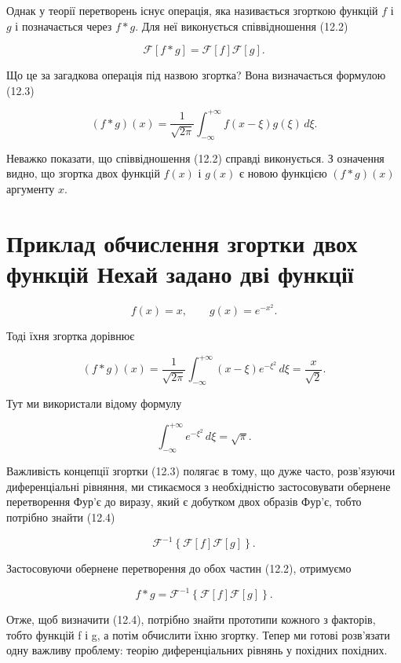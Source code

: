 \documentclass[
  ukrainian,
]{article}
\begin{document}
Однак у теорії перетворень існує операція, яка називається згорткою
функцій \(f\) і \(g\) і позначається через \(f*g\). Для неї виконується
співвідношення (12.2)

\[
\mathcal{F}[f*g] = \mathcal{F}[f]\mathcal{F}[g].
\]

Що це за загадкова операція під назвою згортка? Вона визначається
формулою (12.3)

\[
(f*g)(x) = \frac{1}{\sqrt{2\pi}} \int_{-\infty}^{+\infty} f(x-\xi)g(\xi)\,d\xi.
\]

Неважко показати, що співвідношення (12.2) справді виконується. З
означення видно, що згортка двох функцій \(f(x)\) і \(g(x)\) є новою
функцією \((f*g)(x)\) аргументу \(x\).

\section{Приклад обчислення згортки двох функцій Нехай задано дві
функції}\label{ux43fux440ux438ux43aux43bux430ux434-ux43eux431ux447ux438ux441ux43bux435ux43dux43dux44f-ux437ux433ux43eux440ux442ux43aux438-ux434ux432ux43eux445-ux444ux443ux43dux43aux446ux456ux439-ux43dux435ux445ux430ux439-ux437ux430ux434ux430ux43dux43e-ux434ux432ux456-ux444ux443ux43dux43aux446ux456ux457}

\[
f(x) = x, \qquad g(x) = e^{-x^2}.
\]

Тоді їхня згортка дорівнює

\[
(f*g)(x) = \frac{1}{\sqrt{2\pi}} \int_{-\infty}^{+\infty} (x-\xi)e^{-\xi^2}\,d\xi = \frac{x}{\sqrt{2}}.
\]

Тут ми використали відому формулу

\[
\int_{-\infty}^{+\infty} e^{-\xi^2}\,d\xi = \sqrt{\pi}.
\]

Важливість концепції згортки (12.3) полягає в тому, що дуже часто,
розв'язуючи диференціальні рівняння, ми стикаємося з необхідністю
застосовувати обернене перетворення Фур'є до виразу, який є добутком
двох образів Фур'є, тобто потрібно знайти (12.4)

\[
\mathcal{F}^{-1}\left\{\mathcal{F}[f]\mathcal{F}[g]\right\}.
\]

Застосовуючи обернене перетворення до обох частин (12.2), отримуємо

\[
f * g = \mathcal{F}^{-1}\left\{\mathcal{F}[f]\mathcal{F}[g]\right\}.
\]

Отже, щоб визначити (12.4), потрібно знайти прототипи кожного з
факторів, тобто функцій f і g, а потім обчислити їхню згортку. Тепер ми
готові розв'язати одну важливу проблему: теорію диференціальних рівнянь
у похідних похідних.
\end{document}
